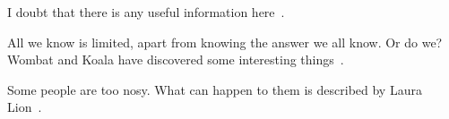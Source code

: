\documentclass{article}
\begin{document}
I doubt that there is any useful information here~\cite{wikibook}.

All we know is limited, apart from knowing the answer we all know. Or do we? Wombat and Koala have discovered some interesting things~\cite{wombat2016}.

Some people are too nosy. What can happen to them is described by Laura Lion~\cite[9]{lion2010}.


\printbibliography
\end{document}
